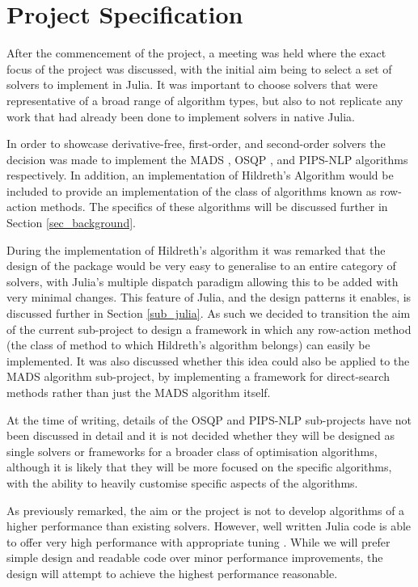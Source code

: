 \section{Project Specification}
After the commencement of the project, a meeting was held where the exact focus of the project was discussed, with the initial aim being to select a set of solvers to implement in Julia. It was important to choose solvers that were representative of a broad range of algorithm types, but also to not replicate any work that had already been done to implement solvers in native Julia. 

In order to showcase derivative-free, first-order, and second-order solvers the decision was made to implement the MADS \cite{Audet2007MeshOptimization}, OSQP \cite{Stellato2017OSQP:Programs}, and PIPS-NLP \cite{ChiangStructuredPIPS-NLP} algorithms respectively. In addition, an implementation of Hildreth's Algorithm \cite{HildrethAPROCEDURE} would be included to provide an implementation of the class of algorithms known as row-action methods. The specifics of these algorithms will be discussed further in Section \ref{sec_background}. 

During the implementation of Hildreth's algorithm it was remarked that the design of the package would be very easy to generalise to an entire category of solvers, with Julia's multiple dispatch paradigm allowing this to be added with very minimal changes. This feature of Julia, and the design patterns it enables, is discussed further in Section \ref{sub_julia}. As such we decided to transition the aim of the current sub-project to design a framework in which any row-action method (the class of method to which Hildreth's algorithm belongs) can easily be implemented. It was also discussed whether this idea could also be applied to the MADS algorithm sub-project, by implementing a framework for direct-search methods rather than just the MADS algorithm itself. 

At the time of writing, details of the OSQP and PIPS-NLP sub-projects have not been discussed in detail and it is not decided whether they will be designed as single solvers or frameworks for a broader class of optimisation algorithms, although it is likely that they will be more focused on the specific algorithms, with the ability to heavily customise specific aspects of the algorithms.

As previously remarked, the aim or the project is not to develop algorithms of a higher performance than existing solvers. However, well written Julia code is able to offer very high performance \cite{JuliaMicro-Benchmarks} with appropriate tuning \cite{PerformanceLanguage}. While we will prefer simple design and readable code over minor performance improvements, the design will attempt to achieve the highest performance reasonable.

